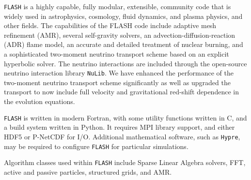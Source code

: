 \documentclass[12pt,titlepage]{article}
\begin{document}
\texttt{FLASH} is a highly capable, fully modular, extensible,
community code that is widely used in astrophysics, cosmology, fluid
dynamics, and plasma physics, and other fields.  The capabilities of
the FLASH code include adaptive mesh refinement (AMR), several
self-gravity solvers, an advection-diffusion-reaction (ADR) flame
model, an accurate and detailed treatment of nuclear burning, and a
sophisticated two-moment neutrino transport scheme based on an
explicit hyperbolic solver.  The neutrino interactions are included
through the open-source neutrino interaction library
\texttt{NuLib}. We have enhanced the
performance of the two-moment neutrino transport scheme significantly
as well as upgraded the transport to now include full velocity and
gravitational red-shift dependence in the evolution equations.

\texttt{FLASH} is written in modern Fortran, with some utility
functions written in C, and a build system written in Python.  It
requires MPI library support, and either HDF5 or P-NetCDF for I/O.
Additional mathematical software, such as \texttt{Hypre}, may be
required to configure \texttt{FLASH} for particular simulations.

Algorithm classes used within \texttt{FLASH} include Sparse Linear
Algebra solvers, FFT, active and passive particles, structured grids,
and AMR.
\end{document}
